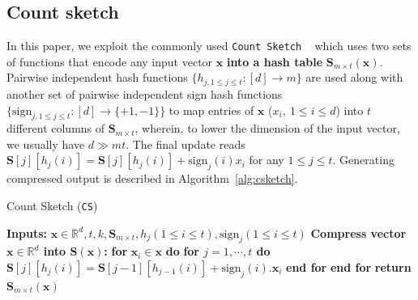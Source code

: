 \documentclass[sigconf, anonymous, review]{acmart}
\begin{document}
\subsection{Count sketch}
 In this paper, we exploit the commonly used \texttt{Count Sketch} ~\citep{DBLP:journals/tcs/CharikarCF04} 
 which uses two sets of functions that encode any input vector $\boldsymbol{x}$ \textbf{into a hash table} $\boldsymbol{S}_{m\times t}(\boldsymbol{x})$. 
Pairwise independent hash functions $\{h_{j,1\leq j\leq t }:[d]\rightarrow m\}$ are used along with another set of pairwise independent sign hash functions $\{\text{sign}_{j,1\leq j\leq t}: [d]\rightarrow \{+1,-1\}\}$ to map entries of $\boldsymbol{x}$ (${x}_i, \:1\leq i\leq d$) into $t$ different columns of $\mathbf{S}_{m\times t}$, wherein, to lower the dimension of the input vector, we usually have $d\gg mt$.  
The final update reads $\mathbf{S}[j][h_j(i)]=\mathbf{S}[j][h_{j}(i)]+\text{sign}_j(i){x}_i$ for any $1 \leq j \leq t$. Generating compressed output is described in Algorithm~\ref{alg:csketch}.

 \begin{algorithm}[H]
\caption{Count Sketch ({\texttt{CS})~\citep{DBLP:journals/tcs/CharikarCF04}} }\label{alg:csketch}
 \begin{algorithmic}[1]
\STATE \textbf{Inputs:} $\boldsymbol{x}\in\mathbb{R}^{d}, t, k, \mathbf{S}_{m\times t}, h_j (1\leq i\leq t), \text{sign}_j (1\leq i\leq t)$
 \STATE \textbf{Compress vector $\boldsymbol{x}\in\mathbb{R}^{d}$ into $\mathbf{S}\left(\boldsymbol{x}\right)$:}
 \STATE \textbf{for} $\boldsymbol{x}_i\in\boldsymbol{x}$ \textbf{do}
 \STATE \quad\textbf{for $j=1,\cdots,t$ do}
 \STATE \quad\quad $\mathbf{S}[j][h_j(i)]=\mathbf{S}[j-1][h_{j-1}(i)]+\text{sign}_j(i).\boldsymbol{x}_i$ 
 \STATE \quad\textbf{end for}
 \STATE \textbf{end for}
 \STATE \textbf{return} $\mathbf{S}_{m\times t}(\boldsymbol{x})$
 \end{algorithmic}
 \end{algorithm}
\end{document}
